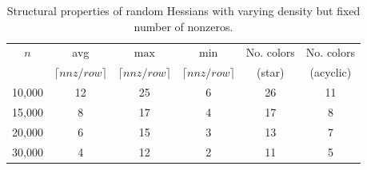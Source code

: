 \documentclass[11pt, twocolumn]{article}
\begin{document}
{\begin{table}[htbp]
\begin{center}
\caption[Structural Properties of Random Hessians with Varying Density but Constant $nnz$ ]
{Structural properties of random Hessians with varying density but fixed number of nonzeros.}
\label{tab:random-sparse}
\begin{tabular}{ | c | c | c | c | c | c |}
\hline
$n$ & avg & $\max$ &  $\min$ & No. colors & No. colors \\
&  $\lceil nnz/row \rceil$ &  $\lceil nnz/row \rceil$ &  $\lceil nnz/row \rceil$ & (star) & (acyclic) \\
\hline
10,000 & 12 & 25 & 6 & 26 & 11 \\
15,000 & 8 & 17 & 4 & 17 & 8 \\
20,000 & 6 & 15 & 3 & 13 & 7 \\
30,000 & 4 & 12 & 2 & 11 & 5 \\
\hline
\end{tabular}
\end{center}
\end{table}



}
\end{document}
